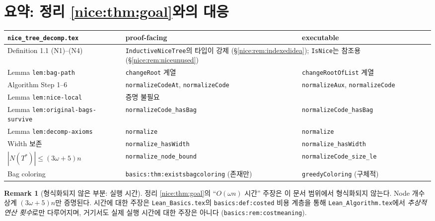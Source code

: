 \documentclass[11pt]{article}
\theoremstyle{definition}
\newtheorem{remark}[definition]{Remark}
\theoremstyle{plain}
\newcommand{\lean}[1]{\texttt{#1}}
\newcommand{\leanfile}[1]{\texttt{#1}}
\begin{document}
\section{요약: 정리 \ref{nice:thm:goal}와의 대응}
\label{nice:sec:summary}

\begin{center}
\begin{tabular}{p{}p{}p{}}
\hline
\leanfile{nice\_tree\_decomp.tex} & proof-facing & executable \\
\hline
Definition 1.1 (N1)--(N4) &
  \multicolumn{2}{p{0.62\textwidth}}{\lean{InductiveNiceTree}의 타입이 강제
  (\S\ref{nice:rem:indexedidea}); \lean{IsNice}는 참조용
  (\S\ref{nice:rem:niceunused})} \\
Lemma \lean{lem:bag-path} &
  \lean{changeRoot} 계열 & \lean{changeRootOfList} 계열 \\
Algorithm Step 1--6 &
  \lean{normalizeCodeAt}, \lean{normalizeCode} &
  \lean{normalizeAux}, \lean{normalizeCode} \\
Lemma \lean{lem:nice-local} &
  \multicolumn{2}{p{0.62\textwidth}}{증명 불필요} \\
Lemma \lean{lem:original-bags-survive} &
  \lean{normalizeCode\_hasBag} & \lean{normalizeCode\_hasBag} \\
Lemma \lean{lem:decomp-axioms} &
  \lean{normalize} & \lean{normalize} \\
Width 보존 &
  \lean{normalize\_hasWidth} & \lean{normalize\_hasWidth} \\
$|N(T^\ast)| \le (3\omega+5)n$ &
  \lean{normalize\_node\_bound} & \lean{normalizeCode\_size\_le} \\
Bag coloring &
  \lean{basics:thm:existsbagcoloring} (존재만) &
  \lean{greedyColoring} (구체적) \\
\hline
\end{tabular}
\end{center}

\begin{remark}[형식화되지 않은 부분: 실행 시간]
정리 \ref{nice:thm:goal}의 ``$O(\omega n)$ 시간'' 주장은 이 문서 범위에서
형식화되지 않는다. Node 개수 상계 $(3\omega+5)n$만 증명된다. 시간에 대한
주장은 \leanfile{Lean\_Basics.tex}의 \lean{basics:def:costed} 비용 계층을 통해
\leanfile{Lean\_Algorithm.tex}에서 \emph{추상적 연산 횟수}로만 다루어지며,
거기서도 실제 실행 시간에 대한 주장은 아니다
(\lean{basics:rem:costmeaning}).
\end{remark}
\end{document}
